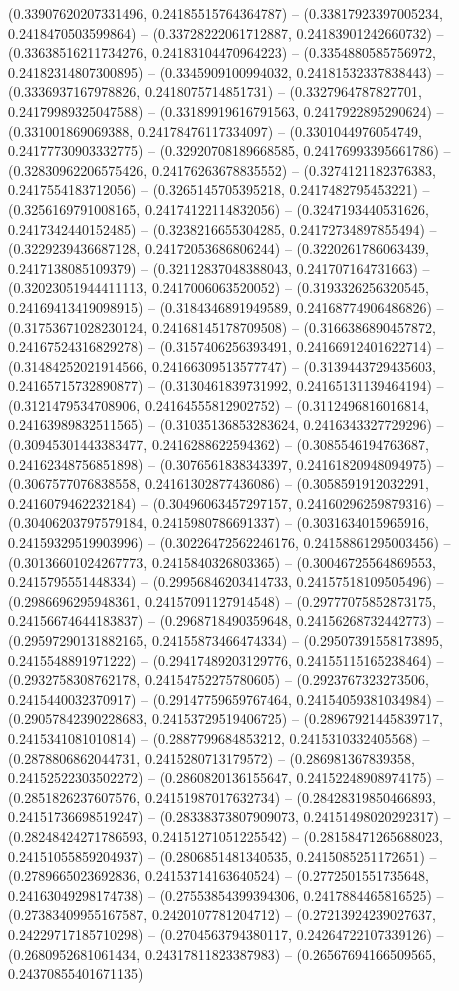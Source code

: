 (0.33907620207331496, 0.24185515764364787) -- (0.33817923397005234, 0.2418470503599864) -- (0.33728222061712887, 0.24183901242660732) -- (0.33638516211734276, 0.24183104470964223) -- (0.3354880585756972, 0.24182314807300895) -- (0.3345909100994032, 0.24181532337838443) -- (0.3336937167978826, 0.2418075714851731) -- (0.3327964787827701, 0.24179989325047588) -- (0.33189919616791563, 0.2417922895290624) -- (0.331001869069388, 0.24178476117334097) -- (0.3301044976054749, 0.24177730903332775) -- (0.32920708189668585, 0.24176993395661786) -- (0.32830962206575426, 0.24176263678835552) -- (0.3274121182376383, 0.2417554183712056) -- (0.3265145705395218, 0.2417482795453221) -- (0.3256169791008165, 0.24174122114832056) -- (0.3247193440531626, 0.2417342440152485) -- (0.3238216655304285, 0.24172734897855494) -- (0.3229239436687128, 0.24172053686806244) -- (0.3220261786063439, 0.2417138085109379) -- (0.32112837048388043, 0.241707164731663) -- (0.32023051944411113, 0.2417006063520052) -- (0.3193326256320545, 0.24169413419098915) -- (0.3184346891949589, 0.24168774906486826) -- (0.31753671028230124, 0.24168145178709508) -- (0.3166386890457872, 0.24167524316829278) -- (0.3157406256393491, 0.24166912401622714) -- (0.31484252021914566, 0.24166309513577747) -- (0.3139443729435603, 0.24165715732890877) -- (0.3130461839731992, 0.24165131139464194) -- (0.3121479534708906, 0.24164555812902752) -- (0.3112496816016814, 0.24163989832511565) -- (0.31035136853283624, 0.2416343327729296) -- (0.30945301443383477, 0.2416288622594362) -- (0.3085546194763687, 0.24162348756851898) -- (0.3076561838343397, 0.24161820948094975) -- (0.3067577076838558, 0.24161302877436086) -- (0.3058591912032291, 0.2416079462232184) -- (0.30496063457297157, 0.24160296259879316) -- (0.30406203797579184, 0.2415980786691337) -- (0.3031634015965916, 0.24159329519903996) -- (0.30226472562246176, 0.24158861295003456) -- (0.30136601024267773, 0.2415840326803365) -- (0.30046725564869553, 0.2415795551448334) -- (0.29956846203414733, 0.24157518109505496) -- (0.2986696295948361, 0.24157091127914548) -- (0.29777075852873175, 0.24156674644183837) -- (0.2968718490359648, 0.24156268732442773) -- (0.29597290131882165, 0.24155873466474334) -- (0.29507391558173895, 0.2415548891971222) -- (0.29417489203129776, 0.24155115165238464) -- (0.2932758308762178, 0.24154752275780605) -- (0.2923767323273506, 0.2415440032370917) -- (0.29147759659767464, 0.24154059381034984) -- (0.29057842390228683, 0.24153729519406725) -- (0.28967921445839717, 0.2415341081010814) -- (0.2887799684853212, 0.2415310332405568) -- (0.2878806862044731, 0.2415280713179572) -- (0.286981367839358, 0.24152522303502272) -- (0.2860820136155647, 0.24152248908974175) -- (0.2851826237607576, 0.24151987017632734) -- (0.28428319850466893, 0.24151736698519247) -- (0.28338373807909073, 0.24151498020292317) -- (0.28248424271786593, 0.24151271051225542) -- (0.28158471265688023, 0.24151055859204937) -- (0.2806851481340535, 0.2415085251172651) -- (0.2789665023692836, 0.24153714163640524) -- (0.2772501551735648, 0.24163049298174738) -- (0.27553854399394306, 0.2417884465816525) -- (0.27383409955167587, 0.2420107781204712) -- (0.27213924239027637, 0.24229717185710298) -- (0.2704563794380117, 0.24264722107339126) -- (0.2680952681061434, 0.24317811823387983) -- (0.26567694166509565, 0.24370855401671135) 